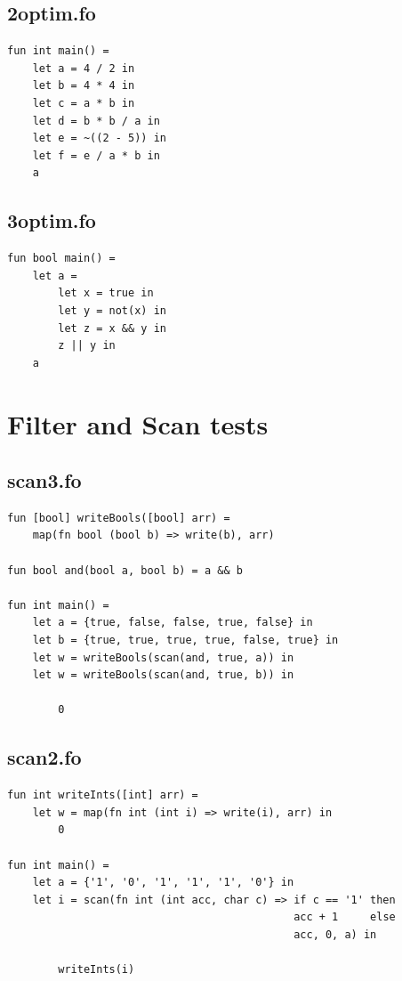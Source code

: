 \documentclass[11pt]{article}
\begin{document}
    \subsection{2optim.fo}
    \begin{lstlisting}[basicstyle=\small]
fun int main() =
    let a = 4 / 2 in
    let b = 4 * 4 in
    let c = a * b in
    let d = b * b / a in
    let e = ~((2 - 5)) in
    let f = e / a * b in
    a
    \end{lstlisting}

    \subsection{3optim.fo}
    \begin{lstlisting}[basicstyle=\small]
fun bool main() =
    let a =
        let x = true in
        let y = not(x) in
        let z = x && y in
        z || y in
    a
    \end{lstlisting}

    \newpage
    \section{Filter and Scan tests} \label{filter_scan_tests}
    \subsection{scan3.fo}
    \begin{lstlisting}[basicstyle=\small]
fun [bool] writeBools([bool] arr) =
    map(fn bool (bool b) => write(b), arr)

fun bool and(bool a, bool b) = a && b

fun int main() =
    let a = {true, false, false, true, false} in
    let b = {true, true, true, true, false, true} in
    let w = writeBools(scan(and, true, a)) in
    let w = writeBools(scan(and, true, b)) in

        0
    \end{lstlisting}

    \subsection{scan2.fo}
    \begin{lstlisting}[basicstyle=\small]
fun int writeInts([int] arr) =
    let w = map(fn int (int i) => write(i), arr) in
        0

fun int main() =
    let a = {'1', '0', '1', '1', '1', '0'} in
    let i = scan(fn int (int acc, char c) => if c == '1' then
                                             acc + 1     else
                                             acc, 0, a) in

        writeInts(i)
    \end{lstlisting}
\end{document}
